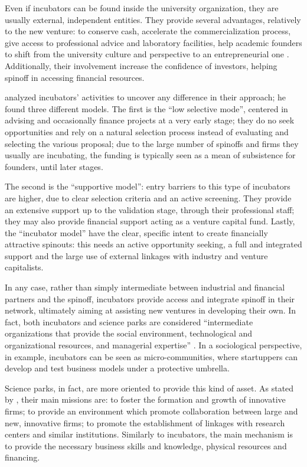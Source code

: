 Even if incubators can be found inside the university organization, they are usually external, independent entities. They provide several advantages, relatively to the new venture: to conserve cash, accelerate the commercialization process, give access to professional advice and laboratory facilities, help academic founders to shift from the university culture and perspective to an entrepreneurial one \citep{Ittelson2002}. Additionally, their involvement increase the confidence of investors, helping spinoff in accessing financial resources.

\citet{Clarysse2005} analyzed incubators' activities to uncover any difference in their approach; he found three different models. The first is the \enquote{low selective mode}, centered in advising and occasionally finance projects at a very early stage; they do no seek opportunities and rely on a natural selection process instead of evaluating and selecting the various proposal; due to the large number of spinoffs and firms they usually are incubating, the funding is typically seen as a mean of subsistence for founders, until later stages. 

The second is the \enquote{supportive model}: entry barriers to this type of incubators are higher, due to clear selection criteria and an active screening. They provide an extensive support up to the validation stage, through their professional staff; they may also provide financial support acting as a venture capital fund. Lastly, the \enquote{incubator model} have the clear, specific intent to create financially attractive spinouts: this needs an active opportunity seeking, a full and integrated support and the large use of external linkages with industry and venture capitalists.

In any case, rather than simply intermediate between industrial and financial partners and the spinoff, incubators provide access and integrate spinoff in their network, ultimately aiming at assisting new ventures in developing their own. In fact, both incubators and science parks are considered \enquote{intermediate organizations that provide the social environment, technological and organizational resources, and managerial expertise} \citep{Phan2005}. In a sociological perspective, in example, incubators can be seen as micro-communities, where startuppers can develop and test business models under a protective umbrella. 

Science parks, in fact, are more oriented to provide this kind of asset. As stated by \citet{Siegel2003}, their main missions are: to foster the formation and growth of innovative firms; to provide an environment which promote collaboration between large and new, innovative firms; to promote the establishment of linkages with research centers and similar institutions. Similarly to incubators, the main mechanism is to provide the necessary business skills and knowledge, physical resources and financing.

